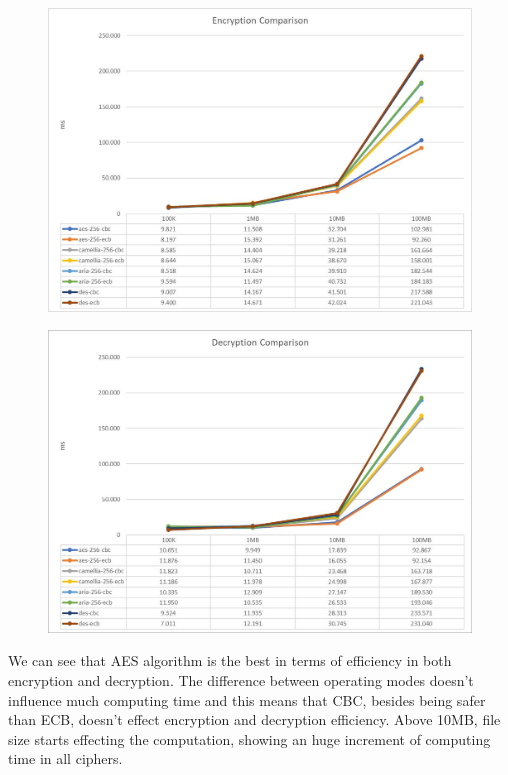 \documentclass[11pt,a4paper]{article}
\begin{document}
\begin{figure}[H]
    \centering
        \includegraphics[width=\textwidth]{enc-hw1-1649359.jpg}
\end{figure}
\begin{figure}[h]
    \centering
        \includegraphics[width=\textwidth]{dec-hw1-1649359.jpg}
\end{figure}
We can see that AES algorithm is the best in terms of efficiency in both encryption and decryption. The difference between operating modes doesn't influence much computing time and this means that CBC, besides being safer than ECB, doesn't effect encryption and decryption efficiency.
Above 10MB, file size starts effecting the computation, showing an huge increment of computing time in all ciphers.
\end{document}
